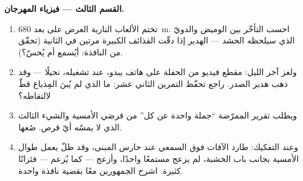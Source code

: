 \begin{problem}
\medskip\noindent\textbf{القسم الثالث --- فيزياء المهرجان.}
\begin{enumerate}[resume]
  \item تختم الألعاب النارية العرض على بعد \qty{680}{m}.
        احسب التأخّر بين الوميض والدويّ الذي سيلحظه الحشد
        ---  الهدير إذا دقّت القذائف الكبيرة مرتين في
        الثانية (تحقّق من النافذة: أيُسمع أم يُحسّ؟).
  \item ولغز آخر الليل: مقطع فيديو من الحفلة على هاتف يبدو،
        عند تشغيله، نحيلًا --- وقد ذهب هدير الصدر. راجع
        تحفّظ التمرين الثاني عشر: ما الذي لم يُبنَ المِذياع
        قطّ لالتقاطه؟
  \item ويطلب تقرير الممرّضة ``جملة واحدة عن كل'' من قرصَي
        الأمسية والشيء الثالث الذي لا يمسّه أيّ قرص. صُغها.
  \item وعند التفكيك: طارد الآفات فوق السمعي عند حارس
        المبنى، وقد ظلّ يعمل طوال الأمسية بجانب باب الخشبة،
        لم يزعج مستمعًا واحدًا، وأزعج --- كما يُزعم ---
        فئرانًا كثيرة. اشرح الجمهورين معًا بقضية نافذة
        واحدة.
\end{enumerate}
\end{problem}
